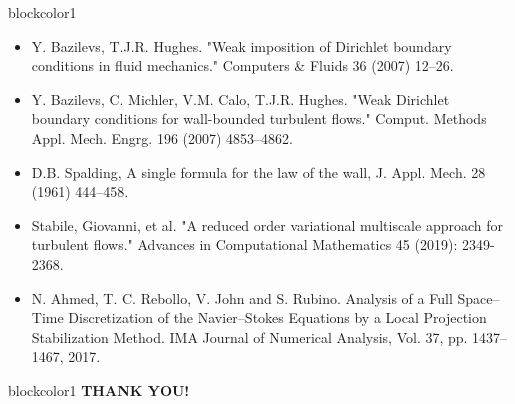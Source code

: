 \documentclass[9pt,compress,t,aspectratio=169]{beamer}
\newcommand{\1}{\begin{pmatrix}
		1\\
		1
\end{pmatrix}}
\newcommand{\highlight}[1]{\textbf{\color{bluemathlab}#1}}
\newcommand{\highlightB}[1]{\textbf{\color{black!15!orangemathlab}#1}}
\begin{document}
\begin{frame}[c]
\begin{beamercolorbox}[sep=1em,wd=\textwidth]{blockcolor1}
		\centering {\large \highlight{Literature}}\\
\begin{itemize}
	\item Y. Bazilevs, T.J.R. Hughes. "Weak imposition of Dirichlet boundary conditions
	in fluid mechanics." Computers \& Fluids 36 (2007) 12--26.
	\item Y. Bazilevs, C. Michler, V.M. Calo, T.J.R. Hughes. "Weak Dirichlet boundary conditions for wall-bounded turbulent flows." Comput. Methods Appl. Mech. Engrg. 196 (2007) 4853--4862.
	\item D.B. Spalding, A single formula for the law of the wall, J. Appl. Mech. 28 (1961) 444--458.
	\item Stabile, Giovanni, et al. "A reduced order variational multiscale approach for turbulent flows." Advances in Computational Mathematics 45 (2019): 2349-2368.
	\item N. Ahmed, T. C. Rebollo, V. John and S. Rubino. Analysis of a Full Space–Time Discretization of the Navier–Stokes Equations by a Local Projection Stabilization Method. IMA Journal of Numerical Analysis, Vol. 37, pp. 1437–1467, 2017.
	
\end{itemize}
	\end{beamercolorbox}
\pause\begin{beamercolorbox}[sep=1em,wd=\textwidth]{blockcolor1}
	\centering \LARGE \highlightB{THANK YOU!}
\end{beamercolorbox}
\end{frame}
\end{document}
